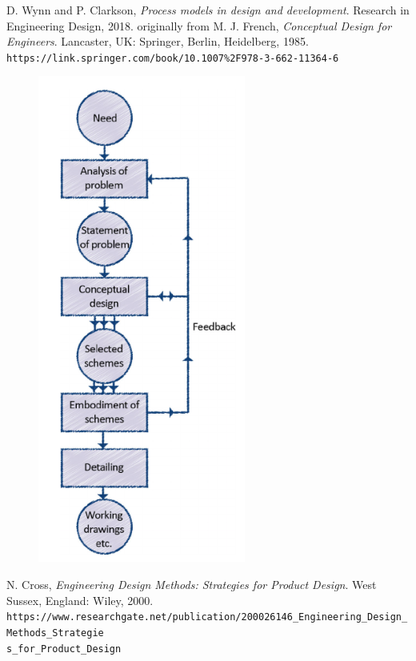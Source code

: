 \documentclass[paper=a4, fontsize=11pt]{article} %
\begin{document}
\begin{thebibliography}{50}
D. Wynn and P. Clarkson, \textit{Process models in design and development}. Research in Engineering Design, 2018.
originally from
\newline
M. J. French, \textit{Conceptual Design for Engineers}. Lancaster, UK: Springer, Berlin, Heidelberg, 1985. \\\texttt{https://link.springer.com/book/10.1007\%2F978-3-662-11364-6}
\begin{figure}[H]
    \centering
    \includegraphics[width=0.6\linewidth]{flow.png}
\end{figure}

N. Cross, \textit{Engineering Design Methods: Strategies for Product Design}. West Sussex, England: Wiley, 2000. \\\texttt{https://www.researchgate.net/publication/200026146\_Engineering\_Design\_Methods\_Strategie}
\\\texttt{s\_for\_Product\_Design}


\end{thebibliography}
\end{document}
